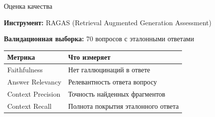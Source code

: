 \documentclass[aspectratio=169,12pt]{beamer}
\begin{document}
\begin{frame}{Оценка качества}

\textbf{Инструмент:} RAGAS (Retrieval Augmented Generation Assessment)

\vspace{0.5em}
\textbf{Валидационная выборка:} 70 вопросов с эталонными ответами

\vspace{1em}
\begin{table}
\centering
\begin{tabular}{lp{7cm}}
\toprule
\textbf{Метрика} & \textbf{Что измеряет} \\
\midrule
Faithfulness & Нет галлюцинаций в ответе \\
Answer Relevancy & Релевантность ответа вопросу \\
Context Precision & Точность найденных фрагментов \\
Context Recall & Полнота покрытия эталонного ответа \\
\bottomrule
\end{tabular}
\end{table}

\end{frame}
\end{document}
